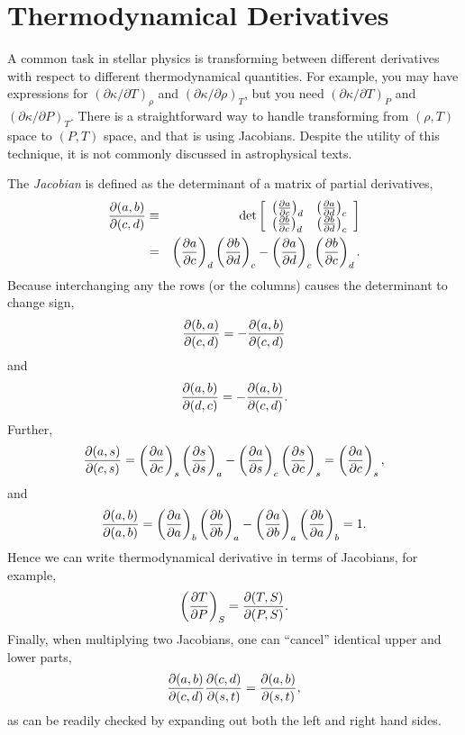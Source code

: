 \chapter{Thermodynamical Derivatives}
\label{s.thermo-derivatives}

A common task in stellar physics is transforming between different derivatives with respect to different thermodynamical quantities.  For example, you may have expressions for $(\partial \kappa/\partial T)_{\rho}$ and $(\partial \kappa/\partial \rho)_{T}$, but you need $(\partial\kappa/\partial T)_{P}$ and $(\partial\kappa/\partial P)_{T}$.  There is a straightforward way to handle transforming from $(\rho,T)$ space to $(P,T)$ space, and that is using Jacobians.  Despite the utility of this technique, it is not commonly discussed in astrophysical texts\cite{landau80:_statis_physic}.

The \emph{Jacobian} is defined as the determinant of a matrix of partial derivatives,
\begin{eqnarray}
\frac{\partial(a,b)}{\partial(c,d)} &\equiv& \det\left[
	\begin{array}{lr}\left(\frac{\partial a}{\partial c}\right)_{d} & \left(\frac{\partial a}{\partial d}\right)_{c}\\
	\left(\frac{\partial b}{\partial c}\right)_{d} & \left(\frac{\partial b}{\partial d}\right)_{c} \end{array}\right] \nonumber \\
 & = & \left(\frac{\partial a}{\partial c}\right)_{d}\left(\frac{\partial b}{\partial d}\right)_{c} - \left(\frac{\partial a}{\partial d}\right)_{c}\left(\frac{\partial b}{\partial c}\right)_{d}.
 \end{eqnarray}
Because interchanging any the rows (or the columns) causes the determinant to change sign, 
\begin{equation}
\frac{\partial(b,a)}{\partial(c,d)} = -\frac{\partial(a,b)}{\partial(c,d)}
\end{equation}
and
\begin{equation}
\frac{\partial(a,b)}{\partial(d,c)} = -\frac{\partial(a,b)}{\partial(c,d)}.
\end{equation}
Further,
\begin{equation}
\frac{\partial(a,s)}{\partial(c,s)} = \left(\frac{\partial a}{\partial c}\right)_{s}\left(\frac{\partial s}{\partial s}\right)_{a} - \left(\frac{\partial a}{\partial s}\right)_{c}\left(\frac{\partial s}{\partial c}\right)_{s} = \left(\frac{\partial a}{\partial c}\right)_{s},
\end{equation}
and
\begin{equation}
\frac{\partial(a,b)}{\partial(a,b)} = \left(\frac{\partial a}{\partial a}\right)_{b}\left(\frac{\partial b}{\partial b}\right)_{a} - \left(\frac{\partial a}{\partial b}\right)_{a}\left(\frac{\partial b}{\partial a}\right)_{b} = 1.
\end{equation}
Hence we can write thermodynamical derivative in terms of Jacobians, for example,
\begin{equation}
\left(\frac{\partial T}{\partial P}\right)_{S} = \frac{\partial(T,S)}{\partial(P,S)}.
\end{equation}
Finally, when multiplying two Jacobians, one can ``cancel'' identical upper and lower parts,
\begin{equation}
\frac{\partial(a,b)}{\partial(c,d)}\frac{\partial(c,d)}{\partial(s,t)} =\frac{\partial(a,b)}{\partial(s,t)},
\end{equation}
as can be readily checked by expanding out both the left and right hand sides.

